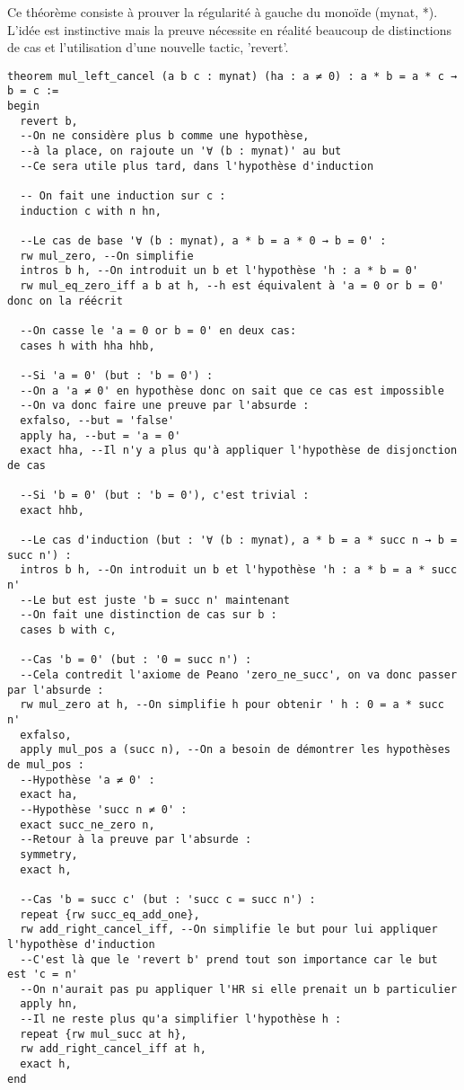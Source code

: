 Ce théorème consiste à prouver la régularité à gauche du monoïde (mynat, *).
L'idée est instinctive mais la preuve nécessite en réalité beaucoup de distinctions de cas et l'utilisation d'une nouvelle tactic, 'revert'.
\begin{verbatim}
theorem mul_left_cancel (a b c : mynat) (ha : a ≠ 0) : a * b = a * c → b = c :=
begin
  revert b,
  --On ne considère plus b comme une hypothèse,
  --à la place, on rajoute un '∀ (b : mynat)' au but
  --Ce sera utile plus tard, dans l'hypothèse d'induction
  
  -- On fait une induction sur c :
  induction c with n hn,

  --Le cas de base '∀ (b : mynat), a * b = a * 0 → b = 0' :
  rw mul_zero, --On simplifie
  intros b h, --On introduit un b et l'hypothèse 'h : a * b = 0'
  rw mul_eq_zero_iff a b at h, --h est équivalent à 'a = 0 or b = 0' donc on la réécrit
  
  --On casse le 'a = 0 or b = 0' en deux cas:
  cases h with hha hhb,
  
  --Si 'a = 0' (but : 'b = 0') :
  --On a 'a ≠ 0' en hypothèse donc on sait que ce cas est impossible
  --On va donc faire une preuve par l'absurde :
  exfalso, --but = 'false'
  apply ha, --but = 'a = 0'
  exact hha, --Il n'y a plus qu'à appliquer l'hypothèse de disjonction de cas
  
  --Si 'b = 0' (but : 'b = 0'), c'est trivial :
  exact hhb,

  --Le cas d'induction (but : '∀ (b : mynat), a * b = a * succ n → b = succ n') :
  intros b h, --On introduit un b et l'hypothèse 'h : a * b = a * succ n'
  --Le but est juste 'b = succ n' maintenant
  --On fait une distinction de cas sur b :
  cases b with c,

  --Cas 'b = 0' (but : '0 = succ n') :
  --Cela contredit l'axiome de Peano 'zero_ne_succ', on va donc passer par l'absurde :
  rw mul_zero at h, --On simplifie h pour obtenir ' h : 0 = a * succ n'
  exfalso,
  apply mul_pos a (succ n), --On a besoin de démontrer les hypothèses de mul_pos :
  --Hypothèse 'a ≠ 0' :
  exact ha,
  --Hypothèse 'succ n ≠ 0' :
  exact succ_ne_zero n,
  --Retour à la preuve par l'absurde :
  symmetry,
  exact h,

  --Cas 'b = succ c' (but : 'succ c = succ n') :
  repeat {rw succ_eq_add_one},
  rw add_right_cancel_iff, --On simplifie le but pour lui appliquer l'hypothèse d'induction
  --C'est là que le 'revert b' prend tout son importance car le but est 'c = n'
  --On n'aurait pas pu appliquer l'HR si elle prenait un b particulier
  apply hn,
  --Il ne reste plus qu'a simplifier l'hypothèse h :
  repeat {rw mul_succ at h},
  rw add_right_cancel_iff at h,
  exact h,
end
\end{verbatim}

